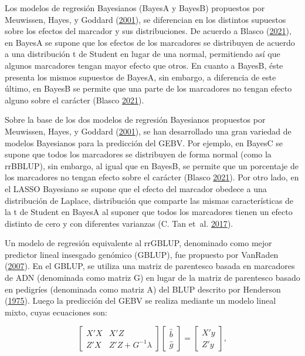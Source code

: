 \documentclass[11pt,spanish,a4paper,oneside,]{book} %
\begin{document}
Los modelos de regresión Bayesianos (BayesA y BayesB) propuestos por Meuwissen, Hayes, y Goddard (\protect\hyperlink{ref-cite:8}{2001}), se diferencian en los distintos supuestos sobre los efectos del marcador y sus distribuciones. De acuerdo a Blasco (\protect\hyperlink{ref-cite:21}{2021}), en BayesA se supone que los efectos de los marcadores se distribuyen de acuerdo a una distribución t de Student en lugar de una normal, permitiendo así que algunos marcadores tengan mayor efecto que otros. En cuanto a BayesB, éste presenta los mismos supuestos de BayesA, sin embargo, a diferencia de este último, en BayesB se permite que una parte de los marcadores no tengan efecto alguno sobre el carácter (Blasco \protect\hyperlink{ref-cite:21}{2021}).

Sobre la base de los dos modelos de regresión Bayesianos propuestos por Meuwissen, Hayes, y Goddard (\protect\hyperlink{ref-cite:8}{2001}), se han desarrollado una gran variedad de modelos Bayesianos para la predicción del GEBV. Por ejemplo, en BayesC se supone que todos los marcadores se distribuyen de forma normal (como la rrBBLUP), sin embargo, al igual que en BayesB, se permite que un porcentaje de los marcadores no tengan efecto sobre el carácter (Blasco \protect\hyperlink{ref-cite:21}{2021}). Por otro lado, en el LASSO Bayesiano se supone que el efecto del marcador obedece a una distribución de Laplace, distribución que comparte las mismas características de la t de Student en BayesA al suponer que todos los marcadores tienen un efecto distinto de cero y con diferentes varianzas (C. Tan et~al. \protect\hyperlink{ref-cite:34}{2017}).

Un modelo de regresión equivalente al rrGBLUP, denominado como mejor predictor lineal insesgado genómico (GBLUP), fue propuesto por VanRaden (\protect\hyperlink{ref-cite:39}{2007}). En el GBLUP, se utiliza una matriz de parentesco basada en marcadores de ADN (denominada como matriz G) en lugar de la matriz de parentesco basado en pedigríes (denominada como matriz A) del BLUP descrito por Henderson (\protect\hyperlink{ref-cite:41}{1975}). Luego la predicción del GEBV se realiza mediante un modelo lineal mixto, cuyas ecuaciones son:

\begin{equation}
\begin{bmatrix}
X'X & X'Z \\
Z'X & Z'Z + G^{-1} \lambda
\end{bmatrix}
\begin{bmatrix}
\hat{b} \\
\hat{g}
\end{bmatrix}
=
\begin{bmatrix}
X'y \\
Z'y
\end{bmatrix}
,
\end{equation}
\end{document}
